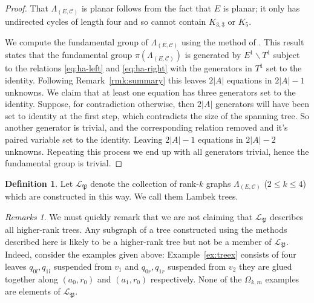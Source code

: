 \documentclass[12pt]{amsart}
\theoremstyle{definition}
\newtheorem{dfn}[thm]{Definition}
\theoremstyle{remark}
\newtheorem{rmks}[thm]{Remarks}
\numberwithin{equation}{section}
\newcommand{\Cc}{\mathcal{C}}
\begin{document}
\begin{proof}
That $\Lambda_{(E,\Cc)}$ is planar follows from the fact that $E$ is planar; it only has undirected cycles of length four and so cannot contain $K_{3,3}$ or $K_5$.

We compute the fundamental group of $\Lambda_{(E,\Cc)}$ using the method of \cite[Theorem 5.1]{KPW}. This result states that the fundamental group $\pi ( \Lambda_{(E,\Cc)})$ is generated by $E^1 \backslash T^1$ subject to the relations \eqref{eq:ha-left} and \eqref{eq:ha-right} with the generators in $T^1$ set to the identity. Following Remark~\ref{rmk:summary} this leaves $2|A|$ equations in $2|A|-1$ unknowns. We claim that at least one equation has three generators set to the identity.
Suppose, for contradiction otherwise, then $2|A|$ generators will have been set to identity at the first step, which contradicts the size of the spanning tree. So another generator is trivial, and the corresponding relation removed and it's paired variable set to the identity. Leaving
$2 |A| -1$ equations in $2|A|-2$ unknowns. Repeating this process we end up with all generators trivial, hence the fundamental group is trivial.
\end{proof}

\begin{dfn}
Let $\mathcal{L}_{\mathfrak{P}}$ denote the collection of rank-$k$ graphs $\Lambda_{(E,\Cc)}$ ($2 \le k \le 4$) which are constructed in this way. We call them Lambek trees.
\end{dfn}

\begin{rmks}
We must quickly remark that we are not claiming that $\mathcal{L}_{\mathfrak{P}}$  describes all higher-rank trees. Any subgraph of a tree constructed using the methods described here is likely to be a higher-rank tree but not be a member of $\mathcal{L}_{\mathfrak{P}}$. Indeed, consider the examples given above: Example~\ref{ex:treex} consists of four leaves $q_{0l}, q_{1l}$ suspended from $v_1$ and $q_{0r}, q_{1r}$ suspended from $v_{2}$ they are glued together along $(a_0,r_0)$ and $(a_1,r_0)$ respectively. 
None of the $\Omega_{k,m}$ examples %
are elements of $\mathcal{L}_{\mathfrak{P}}$.
\end{rmks}
\end{document}

